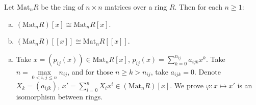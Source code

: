 \begin{ex}
    Let $\mathrm{Mat}_{n}R$ be the ring of $n\times n$ matrices over a ring $R$. Then for each $n\geq 1$:
    \begin{enumerate}[(a)]
        \item $(\mathrm{Mat}_{n}R)[x]\cong \mathrm{Mat}_{n}R[x]$.
        \item $(\mathrm{Mat}_{n}R)[[x]]\cong \mathrm{Mat}_{n}R[[x]]$.
    \end{enumerate}
\end{ex}

\begin{answer}
    \begin{enumerate}[(a)]
        \item Take $x=(p_{ij}(x))\in\mathrm{Mat}_{n}R[x]$, $p_{ij}(x)=\sum\limits_{k=0}^{n_{ij}}a_{ijk}x^{k}$. Take $n=\max\limits_{0<i,j\leq n}n_{ij}$, and for those $n\geq k>n_{ij}$, take $a_{ijk}=0$. Denote $X_{k}=(a_{ijk})$, $x'=\sum\limits_{i=0}^{n}X_{i}x^{i}\in (\mathrm{Mat}_{n}R)[x]$. We prove $\varphi:x\mapsto x'$ is an isomorphism between rings.
        

\end{enumerate}
\end{answer}
